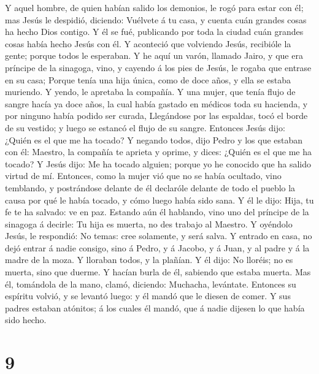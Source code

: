  Y aquel hombre, de quien habían salido los demonios, le
rogó para estar con él; mas Jesús le despidió, diciendo: 
Vuélvete á tu casa, y cuenta cuán grandes cosas ha hecho Dios contigo. Y
él se fué, publicando por toda la ciudad cuán grandes cosas había hecho
Jesús con él.  Y aconteció que volviendo Jesús, recibióle
la gente; porque todos le esperaban.  Y he aquí un varón,
llamado Jairo, y que era príncipe de la sinagoga, vino, y cayendo á los
pies de Jesús, le rogaba que entrase en su casa;  Porque
tenía una hija única, como de doce años, y ella se estaba muriendo. Y
yendo, le apretaba la compañía.  Y una mujer, que tenía
flujo de sangre hacía ya doce años, la cual había gastado en médicos
toda su hacienda, y por ninguno había podido ser curada, 
Llegándose por las espaldas, tocó el borde de su vestido; y luego se
estancó el flujo de su sangre.  Entonces Jesús dijo: ¿Quién
es el que me ha tocado? Y negando todos, dijo Pedro y los que estaban
con él: Maestro, la compañía te aprieta y oprime, y dices: ¿Quién es el
que me ha tocado?  Y Jesús dijo: Me ha tocado alguien;
porque yo he conocido que ha salido virtud de mí. 
Entonces, como la mujer vió que no se había ocultado, vino temblando, y
postrándose delante de él declaróle delante de todo el pueblo la causa
por qué le había tocado, y cómo luego había sido sana.  Y
él le dijo: Hija, tu fe te ha salvado: ve en paz.  Estando
aún él hablando, vino uno del príncipe de la sinagoga á decirle: Tu hija
es muerta, no des trabajo al Maestro.  Y oyéndolo Jesús, le
respondió: No temas: cree solamente, y será salva.  Y
entrado en casa, no dejó entrar á nadie consigo, sino á Pedro, y á
Jacobo, y á Juan, y al padre y á la madre de la moza.  Y
lloraban todos, y la plañían. Y él dijo: No lloréis; no es muerta, sino
que duerme.  Y hacían burla de él, sabiendo que estaba
muerta.  Mas él, tomándola de la mano, clamó, diciendo:
Muchacha, levántate.  Entonces su espíritu volvió, y se
levantó luego: y él mandó que le diesen de comer.  Y sus
padres estaban atónitos; á los cuales él mandó, que á nadie dijesen lo
que había sido hecho.

\hypertarget{section-8}{%
\section{9}\label{section-8}}

